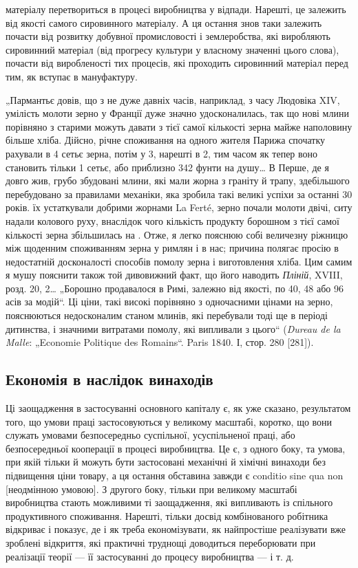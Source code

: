 \parcont{}  %
матеріалу перетвориться в процесі виробництва у відпади. Нарешті, це залежить від якості самого
сировинного матеріалу. А ця остання знов таки залежить почасти від розвитку добувної промисловості і
землеробства, які виробляють сировинний матеріал (від прогресу культури у власному значенні цього
слова), почасти від виробленості тих процесів, які проходить
сировинний матеріал перед тим, як вступає в мануфактуру.

„Пармантьє довів, що з не дуже давніх часів, наприклад, з часу Людовіка XIV, умілість молоти зерно у
Франції дуже
значно удосконалилась, так що нові млини порівняно з старими
можуть давати з тієї самої кількості зерна майже наполовину
більше хліба. Дійсно, річне споживання на одного жителя Парижа
спочатку рахували в 4 сетьє зерна, потім у 3, нарешті в 2, тим часом як тепер воно становить тільки
1 сетьє, або приблизно
342 фунти на душу\dots{} В Перше, де я довго жив, грубо збудовані млини, які мали жорна з граніту й
трапу, здебільшого перебудовано за правилами механіки, яка зробила такі великі успіхи за останні 30
років. їх устаткували добрими жорнами La Ferté,
зерно почали молоти двічі, ситу надали колового руху, внаслідок чого кількість продукту борошном з
тієї самої кількості
зерна збільшилась на . Отже, я легко пояснюю собі величезну
ріжницю між щоденним споживанням зерна у римлян і в нас;
причина полягає просію в недостатній досконалості способів
помолу зерна і виготовлення хліба. Цим самим я мушу пояснити
також той дивовижний факт, що його наводить \emph{Пліній}, XVIII,
розд. 20, 2\dots{} „Борошно продавалося в Римі, залежно від якості,
по 40, 48 або 96 асів за модій“. Ці ціни, такі високі порівняно
з одночасними цінами на зерно, пояснюються недосконалим станом млинів, які перебували тоді ще в
періоді дитинства, і значними витратами помолу, які випливали з цього“ (\emph{Dureau de la Malle}:
„Economie Politique des Romains“. Paris 1840. І, стор.
280 [281]).

\subsection{Економія в наслідок винаходів}

Ці заощадження в застосуванні основного капіталу є, як уже
сказано, результатом того, що умови праці застосовуються
у великому масштабі, коротко, що вони служать умовами безпосередньо суспільної, усуспільненої праці,
або безпосередньої
кооперації в процесі виробництва. Це є, з одного боку, та умова,
при якій тільки й можуть бути застосовані механічні й хімічні
винаходи без підвищення ціни товару, а ця остання обставина
завжди є conditio sine qua non [неодмінною умовою]. З другого
боку, тільки при великому масштабі виробництва стають можливими ті заощадження, які випливають із
спільного продуктивного
споживання. Нарешті, тільки досвід комбінованого робітника відкриває і показує, де і як треба
економізувати, як найпростіше
реалізувати вже зроблені відкриття, які практичні труднощі доводиться
переборювати при реалізації теорії — її застосуванні до
процесу виробництва — і т. д.

